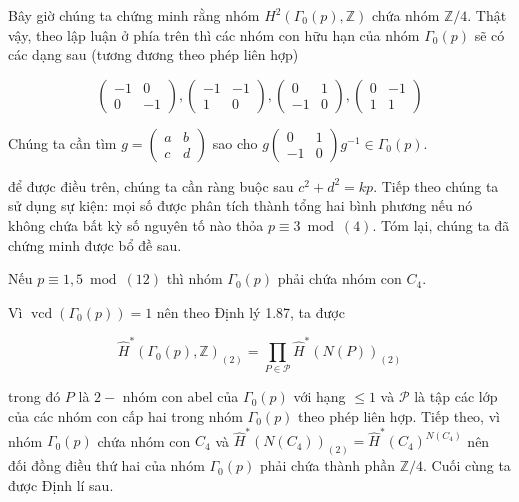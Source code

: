 Bây giờ chúng ta chứng minh rằng nhóm $H^{2}\left(\Gamma_{0}(p), \mathbb{Z}\right)$ chứa nhóm $\mathbb{Z} / 4$. Thật vậy, theo lập luận ở phía trên thì các nhóm con hữu hạn của nhóm $\Gamma_{0}(p)$ sẽ có các dạng sau (tương đương theo phép liên hợp)

$$
    \left(\begin{array}{cc}
            -1 & 0  \\
            0  & -1
        \end{array}\right),\left(\begin{array}{cc}
            -1 & -1 \\
            1  & 0
        \end{array}\right),\left(\begin{array}{cc}
            0  & 1 \\
            -1 & 0
        \end{array}\right),\left(\begin{array}{cc}
            0 & -1 \\
            1 & 1
        \end{array}\right)
$$

Chúng ta cần tìm $g=\left(\begin{array}{ll}a & b \\ c & d\end{array}\right)$ sao cho
$g\left(\begin{array}{cc}
            0  & 1 \\
            -1 & 0
        \end{array}\right) g^{-1} \in \Gamma_{0}(p)$.

để được điều trên, chúng ta cần ràng buộc sau $c^{2}+d^{2}=k p$. Tiếp theo chúng ta sử dụng sự kiện: mọi số được phân tích thành tổng hai bình phương nếu nó không chứa bất kỳ số nguyên tố nào thỏa $p \equiv 3 \bmod (4)$. Tóm lại, chúng ta đã chứng minh được bổ đề sau.

\begin{lemma}
    Nếu $p \equiv 1,5 \bmod (12)$ thì nhóm $\Gamma_{0}(p)$ phải chứa nhóm con $C_{4}$.
\end{lemma}

Vì $\operatorname{vcd}\left(\Gamma_{0}(p)\right)=1$ nên theo Định lý 1.87, ta được

$$
    \widehat{H}^{*}\left(\Gamma_{0}(p), \mathbb{Z}\right)_{(2)}=\prod_{P \in \mathcal{P}} \widehat{H}^{*}(N(P))_{(2)}
$$

trong đó $P$ là $2-$ nhóm con abel của $\Gamma_{0}(p)$ với hạng $\leq 1$ và $\mathcal{P}$ là tập các lớp của các nhóm con cấp hai trong nhóm $\Gamma_{0}(p)$ theo phép liên hợp. Tiếp theo, vì nhóm $\Gamma_{0}(p)$ chứa nhóm con $C_{4}$ và $\widehat{H}^{*}\left(N\left(C_{4}\right)\right)_{(2)}=\widehat{H}^{*}\left(C_{4}\right)^{N\left(C_{4}\right)}$ nên đối đồng điều thứ hai của nhóm $\Gamma_{0}(p)$ phải chứa thành phần $\mathbb{Z} / 4$. Cuối cùng ta được Định lí sau.

